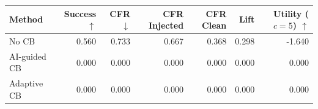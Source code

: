 \begin{tabular}{lrrrrrr}
\toprule
Method & Success $\uparrow$ & CFR $\downarrow$ & CFR Injected & CFR Clean & Lift & Utility ($c=5$) $\uparrow$ \\
\midrule
No CB & 0.560 & 0.733 & 0.667 & 0.368 & 0.298 & -1.640 \\
AI-guided CB & 0.000 & 0.000 & 0.000 & 0.000 & 0.000 & 0.000 \\
Adaptive CB & 0.000 & 0.000 & 0.000 & 0.000 & 0.000 & 0.000 \\
\bottomrule
\end{tabular}
